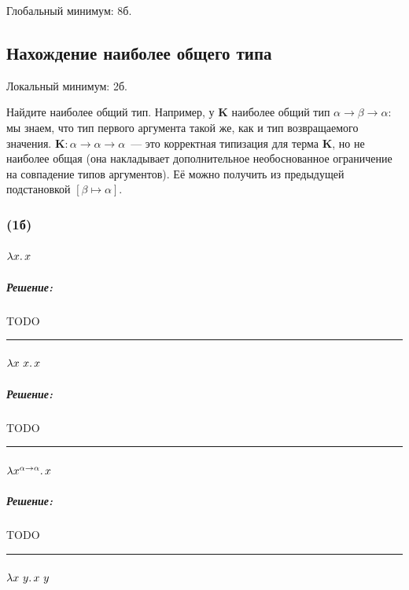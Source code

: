\documentclass{article}
\newenvironment{proof}{\subparagraph{\hspace{-1em}Решение:\newline}}{\par\noindent\rule{\textwidth}{0.4pt}}
\newcommand{\term}[1]{\mathbf{#1}}
\newcommand{\ap}{~}
\newcommand{\subst}[3]{\left[#2 \mapsto #3 \right] #1}
\begin{document}
    Глобальный минимум: 8б.

    \subsection{Нахождение наиболее общего типа}

    Локальный минимум: 2б.

    Найдите наиболее общий тип.
    Например, у $\term{K}$ наиболее общий тип $\alpha \to \beta \to \alpha$: мы знаем, что тип первого аргумента такой же, как и тип возвращаемого значения.
    $\term{K} : \alpha \to \alpha \to \alpha$~--- это корректная типизация
    для терма $\term{K}$, но не наиболее общая (она накладывает дополнительное необоснованное ограничение на совпадение типов аргументов).
    Её можно получить из предыдущей подстановкой $\subst{}{\beta}{\alpha}$.

    \subsubsection{(1б)}

    \paragraph{} $\lambda x\ldotp x$

    \begin{proof}
        TODO %
    \end{proof}

    \paragraph{} $\lambda x~x\ldotp x$

    \begin{proof}
        TODO %
    \end{proof}

    \paragraph{} $\lambda x^{\alpha \to \alpha}\ldotp x$

    \begin{proof}
        TODO %
    \end{proof}

    \paragraph{} $\lambda x~y\ldotp x \ap y$
\end{document}
